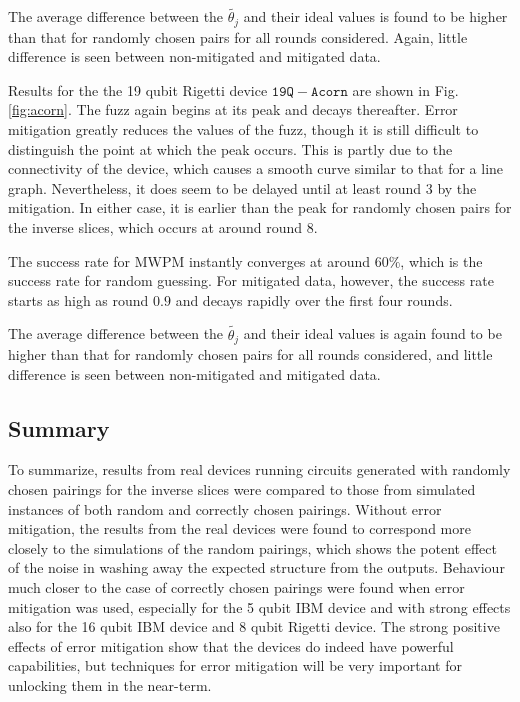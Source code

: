\documentclass[aps,prl,twocolumn,showpacs,preprintnumbers]{revtex4-1}
\begin{document}
The average difference between the $\tilde{\theta_j}$ and their ideal values is found to be higher than that for randomly chosen pairs for all rounds considered. Again, little difference is seen between non-mitigated and mitigated data.

Results for the the 19 qubit Rigetti device $\mathtt{19Q-Acorn}$ are shown in Fig. \ref{fig:acorn}. The fuzz again begins at its peak and decays thereafter. Error mitigation greatly reduces the values of the fuzz, though it is still difficult to distinguish the point at which the peak occurs. This is partly due to the connectivity of the device, which causes a smooth curve similar to that for a line graph. Nevertheless, it does seem to be delayed until at least round 3 by the mitigation. In either case, it is earlier than the peak for randomly chosen pairs for the inverse slices, which occurs at around round 8.

The success rate for MWPM instantly converges at around $60\%$, which is the success rate for random guessing. For mitigated data, however, the success rate starts as high as round $0.9$ and decays rapidly over the first four rounds.

The average difference between the $\tilde{\theta_j}$ and their ideal values is again found to be higher than that for randomly chosen pairs for all rounds considered, and little difference is seen between non-mitigated and mitigated data.

\subsection{Summary}

To summarize, results from real devices running circuits generated with randomly chosen pairings for the inverse slices were compared to those from simulated instances of both random and correctly chosen pairings. Without error mitigation, the results from the real devices were found to correspond more closely to the simulations of the random pairings, which shows the potent effect of the noise in washing away the expected structure from the outputs. Behaviour much closer to the case of correctly chosen pairings were found when error mitigation was used, especially for the 5 qubit IBM device and with strong effects also for the 16 qubit IBM device and 8 qubit Rigetti device. The strong positive effects of error mitigation show that the devices do indeed have powerful capabilities, but techniques for error mitigation will be very important for unlocking them in the near-term.
\end{document}
